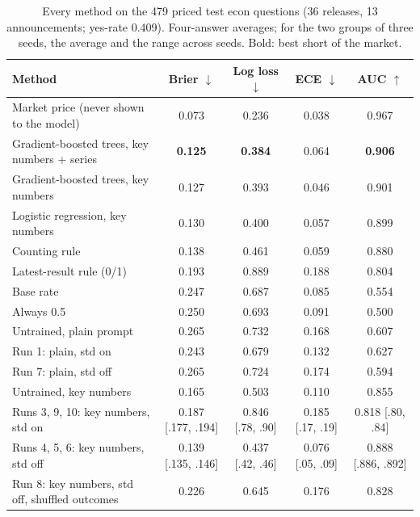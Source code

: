 \documentclass[11pt]{article}
\begin{document}
\begin{table}[H]
\centering\small
\caption{Every method on the 479 priced test econ questions (36 releases, 13 announcements; yes-rate 0.409). Four-answer averages; for the two groups of three seeds, the average and the range across seeds. Bold: best short of the market.}
\label{tab:testmain}
\setlength{\tabcolsep}{4pt}
\begin{tabular}{lcccc}
\toprule
Method & Brier $\downarrow$ & Log loss $\downarrow$ & ECE $\downarrow$ & AUC $\uparrow$ \\
\midrule
Market price (never shown to the model) & 0.073 & 0.236 & 0.038 & 0.967 \\
\midrule
Gradient-boosted trees, key numbers + series & \textbf{0.125} & \textbf{0.384} & 0.064 & \textbf{0.906} \\
Gradient-boosted trees, key numbers & 0.127 & 0.393 & 0.046 & 0.901 \\
Logistic regression, key numbers & 0.130 & 0.400 & 0.057 & 0.899 \\
Counting rule & 0.138 & 0.461 & 0.059 & 0.880 \\
Latest-result rule (0/1) & 0.193 & 0.889 & 0.188 & 0.804 \\
Base rate & 0.247 & 0.687 & 0.085 & 0.554 \\
Always 0.5 & 0.250 & 0.693 & 0.091 & 0.500 \\
\midrule
Untrained, plain prompt & 0.265 & 0.732 & 0.168 & 0.607 \\
Run 1: plain, std on & 0.243 & 0.679 & 0.132 & 0.627 \\
Run 7: plain, std off & 0.265 & 0.724 & 0.174 & 0.594 \\
\midrule
Untrained, key numbers & 0.165 & 0.503 & 0.110 & 0.855 \\
Runs 3, 9, 10: key numbers, std on & 0.187 {\scriptsize[.177, .194]} & 0.846 {\scriptsize[.78, .90]} & 0.185 {\scriptsize[.17, .19]} & 0.818 {\scriptsize[.80, .84]} \\
Runs 4, 5, 6: key numbers, std off & 0.139 {\scriptsize[.135, .146]} & 0.437 {\scriptsize[.42, .46]} & 0.076 {\scriptsize[.05, .09]} & 0.888 {\scriptsize[.886, .892]} \\
Run 8: key numbers, std off, shuffled outcomes & 0.226 & 0.645 & 0.176 & 0.828 \\
\bottomrule
\end{tabular}
\end{table}
\end{document}
